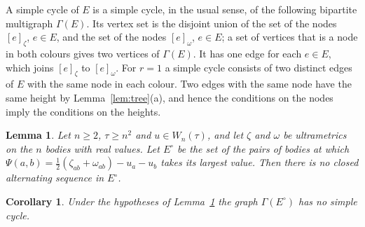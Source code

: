\documentclass[11pt]{amsart}
\newtheorem{lemma}[theorem]{Lemma}
\newtheorem{corollary}[theorem]{Corollary}
\theoremstyle{definition}
\theoremstyle{remark}
\numberwithin{equation}{section}
\newcommand{\Eo}{E^{\circ}}
\newcommand{\nd}[2]{[#1]_{#2}}
\begin{document}
A simple cycle of $E$ is a simple cycle, in the usual sense, of the following bipartite multigraph
$\Gamma(E)$. Its vertex set is the disjoint union of the set of the nodes $\nd{e}{\zeta}$, $e \in E$,
and the set of the nodes $\nd{e}{\omega}$, $e \in E$; a set of vertices that is a node in both colours
gives two vertices of $\Gamma(E)$. It has one edge for each $e \in E$, which joins $\nd{e}{\zeta}$ to
$\nd{e}{\omega}$. For $r = 1$ a simple cycle consists of two distinct edges of $E$ with the same node in
each colour. Two edges with the same node have the same height by Lemma~\ref{lem:tree}(a), and hence
the conditions on the nodes imply the conditions on the heights.

\begin{lemma}\label{lem:C}
Let $n \ge 2$, $\tau \ge n^2$ and $u \in W_n(\tau)$, and let $\zeta$ and $\omega$ be ultrametrics on
the $n$ bodies with real values. Let $\Eo$ be the set of the pairs of bodies at which
$\Psi(a, b) = \tfrac12(\zeta_{ab} + \omega_{ab}) - u_a - u_b$ takes its largest value. Then there is no
closed alternating sequence in $\Eo$.
\end{lemma}

\begin{corollary}\label{cor:C}
Under the hypotheses of Lemma~\ref{lem:C} the graph $\Gamma(\Eo)$ has no simple cycle.
\end{corollary}
\end{document}
